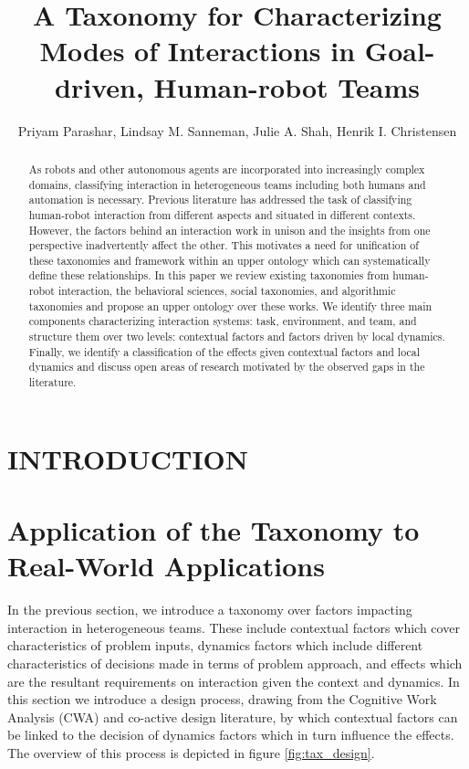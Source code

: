 \documentclass[letterpaper, 10 pt, conference]{ieeeconf}  %
\title{\LARGE \bf
A Taxonomy for Characterizing Modes of Interactions in Goal-driven, Human-robot Teams
}
\author{
Priyam Parashar, Lindsay M. Sanneman, Julie A. Shah, Henrik I. Christensen
}
\theoremstyle{definition}
\begin{document}
\maketitle
\thispagestyle{empty}
\pagestyle{empty}


\begin{abstract}

As robots and other autonomous agents are incorporated into increasingly complex domains, classifying interaction in heterogeneous teams including both humans and automation is necessary. Previous literature has addressed the task of classifying human-robot interaction from different aspects and situated in different contexts. However, the factors behind an interaction work in unison and the insights from one perspective inadvertently affect the other. This motivates a need for unification of these taxonomies and framework within an upper ontology which can systematically define these relationships. In this paper we review existing taxonomies from human-robot interaction, the behavioral sciences, social taxonomies, and algorithmic taxonomies and propose an upper ontology over these works. We identify three main components characterizing interaction systems: task, environment, and team, and structure them over two levels: contextual factors and factors driven by local dynamics. Finally, we identify a classification of the effects given contextual factors and local dynamics and discuss open areas of research motivated by the observed gaps in the literature. 

\end{abstract}



\section{INTRODUCTION}

\section{Application of the Taxonomy to Real-World Applications}
In the previous section, we introduce a taxonomy over factors impacting interaction in heterogeneous teams. These include contextual factors which cover characteristics of problem inputs, dynamics factors which include different characteristics of decisions made in terms of problem approach, and effects which are the resultant requirements on interaction given the context and dynamics. In this section we introduce a design process, drawing from the Cognitive Work Analysis (CWA) and co-active design literature, by which contextual factors can be linked to the decision of dynamics factors which in turn influence the effects. The overview of this process is depicted in figure \ref{fig:tax_design}.
\end{document}
